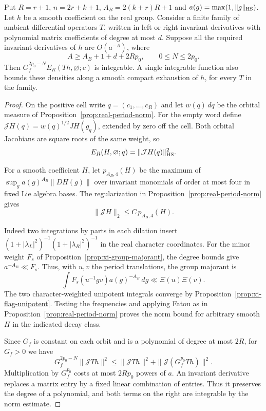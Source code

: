 \begin{auxlemma}\label{lem:empty-word-exhaustion}
Put \(R=r+1\), \(n=2r+k+1\), \(A_B=2(k+r)R+1\) and \(a(g)=\max(1,\|g\|_{\rm HS})\). Let \(h\) be a smooth coefficient on the real group. Consider a finite family of ambient differential operators \(T\), written in left or right invariant derivatives with polynomial matrix coefficients of degree at most \(d\). Suppose all the required invariant derivatives of \(h\) are \(O(a^{-A})\), where
\[
              A\ge A_B+1+d+2Rp_0,\qquad 0\le N\le2p_0 .
\]
Then \(G_f^{2p_0-N}E_R(Th,\varnothing;c)\) is integrable. A single integrable function also bounds these densities along a smooth compact exhaustion of \(h\), for every \(T\) in the family.
\end{auxlemma}
\begin{proof}
On the positive cell write \(q=(c_1,\ldots,c_R)\) and let \(w(q)\,dq\) be the orbital measure of Proposition~\ref{prop:real-period-norm}. For the empty word define \(\mathcal JH(q)=w(q)^{1/2}JH(g_q)\), extended by zero off the cell. Both orbital Jacobians are square roots of the same weight, so
\[
       E_R(H,\varnothing;q)=\|\mathcal JH(q)\|_{\rm HS}^2 .
\]

For a smooth coefficient \(H\), let \(p_{A_B,4}(H)\) be the maximum of \(\sup_g a(g)^{A_B}\|D H(g)\|\) over invariant monomials of order at most four in fixed Lie algebra bases. The regularization in Proposition~\ref{prop:real-period-norm} gives
\[
                    \|\mathcal JH\|_2\le C\,p_{A_B,4}(H).
\]

Indeed two integrations by parts in each dilation insert \((1+|\lambda_L|^2)^{-1}(1+|\lambda_R|^2)^{-1}\) in the real character coordinates. For the minor weight \(F_s\) of Proposition~\ref{prop:xi-group-majorant}, the degree bounds give \(a^{-A_B}\ll F_s\). Thus, with \(u,v\) the period translations, the group majorant is
\[
 \int F_s(u^{-1}gv)a(g)^{-A_B}\,dg\ll\Xi(u)\Xi(v).
\]
The two character-weighted unipotent integrals converge by Proposition~\ref{prop:xi-flag-unipotent}. Testing the frequencies and applying Fatou as in Proposition~\ref{prop:real-period-norm} proves the norm bound for arbitrary smooth \(H\) in the indicated decay class.

Since \(G_f\) is constant on each orbit and is a polynomial of degree at most \(2R\), for \(G_f>0\) we have
\[
 G_f^{2p_0-N}\|\mathcal JTh\|^2
       \le \|\mathcal JTh\|^2+\|\mathcal J(G_f^{p_0}Th)\|^2 .
\]
Multiplication by \(G_f^{p_0}\) costs at most \(2Rp_0\) powers of \(a\). An invariant derivative replaces a matrix entry by a fixed linear combination of entries. Thus it preserves the degree of a polynomial, and both terms on the right are integrable by the norm estimate.


\end{proof}
